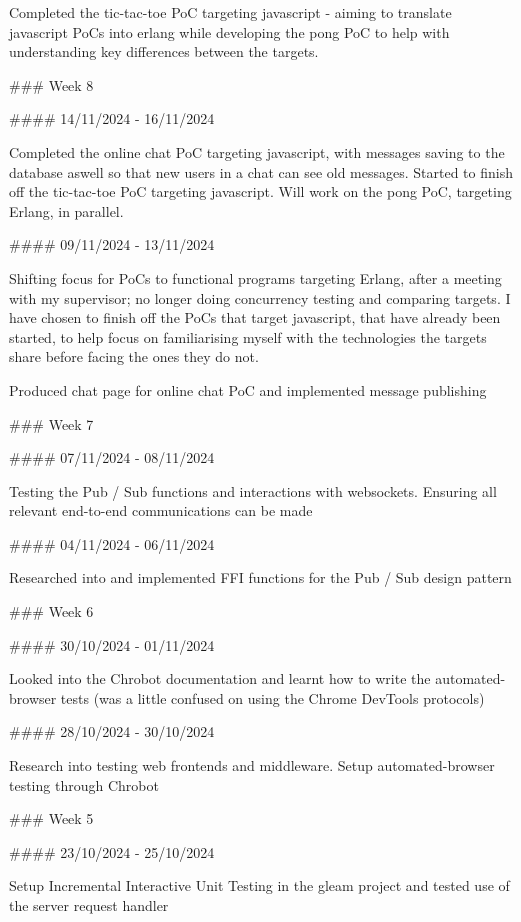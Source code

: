 \documentclass[]{final}
\begin{document}
\begin{markdown}
  Completed the tic-tac-toe PoC targeting javascript - aiming to translate
  javascript PoCs into erlang while developing the pong PoC to help with
  understanding key differences between the targets.

  ### Week 8

  #### 14/11/2024 - 16/11/2024

  Completed the online chat PoC targeting javascript, with messages saving to the
  database aswell so that new users in a chat can see old messages. Started to
  finish off the tic-tac-toe PoC targeting javascript. Will work on the pong PoC,
  targeting Erlang, in parallel.

  #### 09/11/2024 - 13/11/2024

  Shifting focus for PoCs to functional programs targeting Erlang, after a meeting
  with my supervisor; no longer doing concurrency testing and comparing targets. I
  have chosen to finish off the PoCs that target javascript, that have already
  been started, to help focus on familiarising myself with the technologies the
  targets share before facing the ones they do not.

  Produced chat page for online chat PoC and implemented message publishing

  ### Week 7

  #### 07/11/2024 - 08/11/2024

  Testing the Pub / Sub functions and interactions with websockets. Ensuring all
  relevant end-to-end communications can be made

  #### 04/11/2024 - 06/11/2024

  Researched into and implemented FFI functions for the Pub / Sub design pattern

  ### Week 6

  #### 30/10/2024 - 01/11/2024

  Looked into the Chrobot documentation and learnt how to write the
  automated-browser tests (was a little confused on using the Chrome DevTools
  protocols)

  #### 28/10/2024 - 30/10/2024

  Research into testing web frontends and middleware. Setup automated-browser
  testing through Chrobot

  ### Week 5

  #### 23/10/2024 - 25/10/2024

  Setup Incremental Interactive Unit Testing in the gleam project and tested use
  of the server request handler


\end{markdown}
\end{document}
